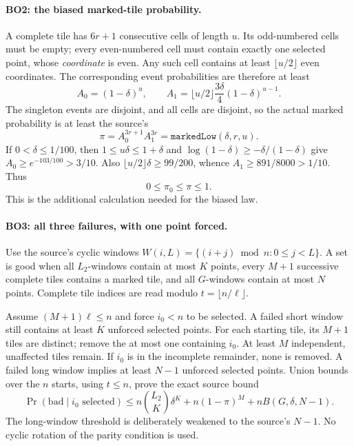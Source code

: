 \paragraph{BO2: the biased marked-tile probability.}
A complete tile has $6r+1$ consecutive cells of length $u$. Its
odd-numbered cells must be empty; every even-numbered cell must contain
exactly one selected point, whose \emph{coordinate} is even.
Any such cell contains at least $\lfloor u/2\rfloor$ even coordinates.
The corresponding event probabilities are therefore at least
\[
 A_0=(1-\delta)^u,\qquad
 A_1=\lfloor u/2\rfloor\frac{3\delta}{4}(1-\delta)^{u-1}.
\]
The singleton events are disjoint, and all cells are disjoint, so the
actual marked probability is at least the source's
\[
 \pi=A_0^{3r+1}A_1^{3r}=\texttt{markedLow}(\delta,r,u).
                                                               \tag{BO.3}
\]
If $0<\delta\le1/100$, then $1\le u\delta\le1+\delta$ and
$\log(1-\delta)\ge-\delta/(1-\delta)$ give
$A_0\ge e^{-103/100}>3/10$. Also
$\lfloor u/2\rfloor\delta\ge99/200$, whence
$A_1\ge891/8000>1/10$. Thus
\[
 0\le\pi_0\le\pi\le1.                                        \tag{BO.4}
\]
This is the additional calculation needed for the biased law.

\paragraph{BO3: all three failures, with one point forced.}
Use the source's cyclic windows
$W(i,L)=\{(i+j)\bmod n:0\le j<L\}$. A set is good when all
$L_2$-windows contain at most $K$ points, every $M+1$ successive
complete tiles contains a marked tile, and all $G$-windows contain at
most $N$ points. Complete tile indices are read modulo
$t=\lfloor n/\ell\rfloor$.

Assume $(M+1)\ell\le n$ and force $i_0<n$ to be selected. A failed
short window still contains at least $K$ unforced selected points.
For each starting tile, its $M+1$ tiles are distinct; remove the at most
one containing $i_0$. At least $M$ independent, unaffected tiles remain.
If $i_0$ is in the incomplete remainder, none is removed. A failed
long window implies at least $N-1$ unforced selected points. Union bounds
over the $n$ starts, using $t\le n$, prove the exact source bound
\[
 \Pr(\mathrm{bad}\mid i_0\text{ selected})\le
 n{L_2\choose K}\delta^K+n(1-\pi)^M+nB(G,\delta,N-1).
                                                               \tag{BO.5}
\]
The long-window threshold is deliberately weakened to the source's
$N-1$. No cyclic rotation of the parity condition is used.

